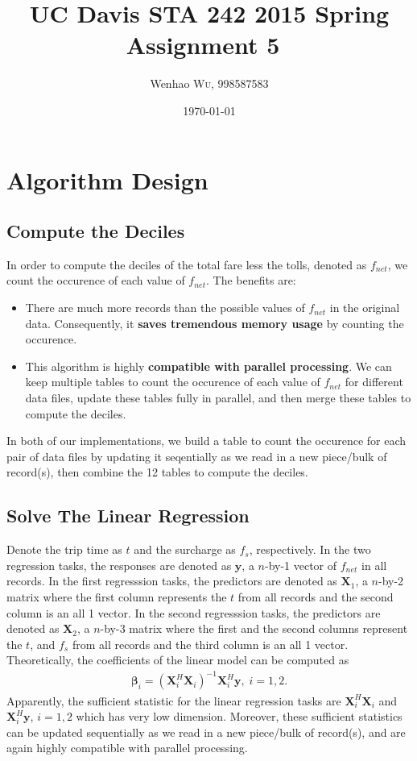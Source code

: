 \documentclass{article}
\title{UC Davis STA 242 2015 Spring Assignment 5~\cite{wu2015NYCTaxi}} %
\author{Wenhao \textsc{Wu}, 998587583} %
\date{\today} %
\begin{document}
\maketitle %


\section{Algorithm Design}

\subsection{Compute the Deciles}
In order to compute the deciles of the total fare less the tolls, denoted as
$f_{net}$, we count the occurence of each value of $f_{net}$. The benefits are:
\begin{itemize}
    \item There are much more records than the possible values of $f_{net}$ in
    the original data. Consequently, it \textbf{saves tremendous memory usage}
    by counting the occurence.
    \item This algorithm is highly \textbf{compatible with parallel processing}.
    We can keep multiple tables to count the occurence of each value of
    $f_{net}$ for different data files, update these tables fully in parallel, and
    then merge these tables to compute the deciles.
\end{itemize}
In both of our implementations, we build a table to count the occurence for
each pair of data files by updating it seqentially as we read in a new
piece/bulk of record(s), then combine the 12 tables to compute the deciles.

\subsection{Solve The Linear Regression}
Denote the trip time as $t$ and the surcharge as $f_s$, respectively. In the two
regression tasks, the responses are denoted as $\mathbf{y}$, a $n$-by-1 vector
of $f_{net}$ in all records. In the first regresssion tasks, the predictors are
denoted as $\mathbf{X}_1$, a $n$-by-2 matrix where the first column represents
the $t$ from all records and the second column is an all 1 vector. In the second
regresssion tasks, the predictors are denoted as $\mathbf{X}_2$, a $n$-by-3
matrix where the first and the second columns represent the $t$, and $f_s$ from
all records and the third column is an all 1 vector. Theoretically, the
coefficients of the linear model can be computed as~\cite{hastie2009elements}
\begin{align}
    \bm{\beta}_i =
    (\mathbf{X}_i^H\mathbf{X}_i)^{-1}\mathbf{X}_i^H\mathbf{y},\;i=1,2.
    \label{eq:lm}
\end{align}
Apparently, the sufficient statistic for the linear regression tasks are
$\mathbf{X}_i^H\mathbf{X}_i$ and $\mathbf{X}_i^H\mathbf{y}$, $i=1,2$ which has
very low dimension. Moreover, these sufficient statistics can be updated
sequentially as we read in a new piece/bulk of record(s), and are again highly
compatible with parallel processing.
\end{document}
